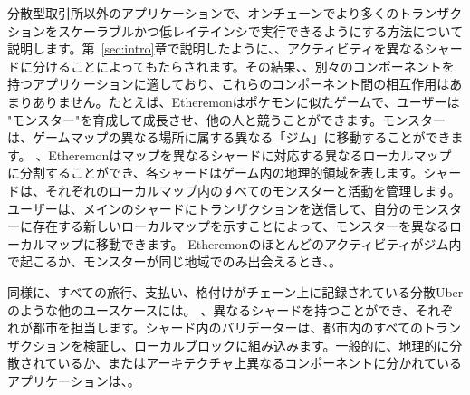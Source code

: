 分散型取引所以外のアプリケーションで、オンチェーンでより多くのトランザクションをスケーラブルかつ低レイテインシで実行できるようにする方法について説明します。第~\ref{sec:intro}章で説明したように、、アクティビティを異なるシャードに分けることによってもたらされます。その結果、、別々のコンポーネントを持つアプリケーションに適しており、これらのコンポーネント間の相互作用はあまりありません。たとえば、Etheremonはポケモンに似たゲームで、ユーザーは "モンスター"を育成して成長させ、他の人と競うことができます。モンスターは、ゲームマップの異なる場所に属する異なる「ジム」に移動することができます。 、Etheremonはマップを異なるシャードに対応する異なるローカルマップに分割することができ、各シャードはゲーム内の地理的領域を表します。シャードは、それぞれのローカルマップ内のすべてのモンスターと活動を管理します。ユーザーは、メインのシャードにトランザクションを送信して、自分のモンスターに存在する新しいローカルマップを示すことによって、モンスターを異なるローカルマップに移動できます。 Etheremonのほとんどのアクティビティがジム内で起こるか、モンスターが同じ地域でのみ出会えるとき、。

同様に、すべての旅行、支払い、格付けがチェーン上に記録されている分散Uberのような他のユースケースには。
、異なるシャードを持つことができ、それぞれが都市を担当します。シャード内のバリデーターは、都市内のすべてのトランザクションを検証し、ローカルブロックに組み込みます。一般的に、地理的に分散されているか、またはアーキテクチャ上異なるコンポーネントに分かれているアプリケーションは、。

